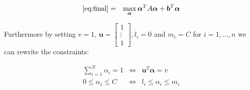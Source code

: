 \documentclass[a4paper, 12pt, titlepage]{article}
\begin{document}
\begin{eqnarray*}
	\eqref{eq:final} &=& \max_{\boldsymbol{\alpha}} \boldsymbol{\alpha}^TA\boldsymbol{\alpha} + \boldsymbol{b}^T\boldsymbol{\alpha}
\end{eqnarray*}

Furthermore by setting $v=1$, $\boldsymbol{u} = \begin{bmatrix}1\\ \vdots \\ 1\end{bmatrix}, l_i = 0$ and $m_i=C$ for $i=1,\ldots,n$ we can rewrite the constraints:

\begin{eqnarray*}
	\sum_{i=1}^N \alpha_i = 1 &\Leftrightarrow& \boldsymbol{u}^T\boldsymbol{\alpha} = v\\
	0 \le \alpha_i \le C &\Leftrightarrow& l_i \le \alpha_i \le m_i
\end{eqnarray*}
\end{document}
